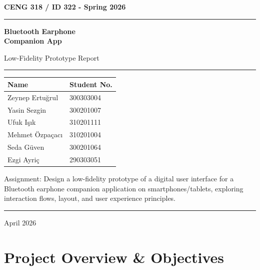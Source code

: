 \documentclass[12pt, a4paper]{report}
\newenvironment{highlight}{%
  \par\vspace{6pt}%
  \noindent%
  \begin{lrbox}{\hlbox}%
    \begin{minipage}{\dimexpr\linewidth-14pt\relax}%
      \vspace{6pt}\small%
}{%
      \vspace{6pt}%
    \end{minipage}%
  \end{lrbox}%
  \noindent\colorbox{lightgray}{%
    \hspace{2pt}%
    \textcolor{accentblue}{\rule[-0.2\baselineskip]{2pt}{\dimexpr\ht\hlbox+\dp\hlbox\relax}}%
    \hspace{8pt}\usebox{\hlbox}\hspace{2pt}%
  }%
  \par\vspace{6pt}%
}
\begin{document}

\begin{titlepage}
  \centering
  \vspace*{2cm}
  {\large\bfseries CENG 318 / ID 322 - Spring 2026}\par
  \vspace{1cm}
  \rule{\linewidth}{1.5pt}\par\vspace{0.5cm}
  {\Huge\bfseries Bluetooth Earphone\\[0.3cm]Companion App}\par
  \vspace{0.4cm}
  {\LARGE Low-Fidelity Prototype Report}\par
  \vspace{0.5cm}
  \rule{\linewidth}{1.5pt}\par
  \vspace{1.5cm}

  {\large
    \begin{tabular}{ll}
      \toprule
      Name & Student No. \\
      \midrule
      Zeynep Ertuğrul & 300303004 \\
      Yasin Sezgin & 300201007 \\
      Ufuk Işık & 310201111 \\
      Mehmet Özpaçacı & 310201004 \\
      Seda Güven & 300201064 \\
      Ezgi Ayriç & 290303051 \\
      \bottomrule
    \end{tabular}
  }\par
  \vspace{1.5cm}

  \begin{highlight}
    Assignment: Design a low-fidelity prototype of a digital user interface
    for a Bluetooth earphone companion application on smartphones/tablets, exploring
    interaction flows, layout, and user experience principles.
  \end{highlight}

  \vfill
  {\large April 2026}
\end{titlepage}

\tableofcontents
\clearpage

\chapter{Project Overview \& Objectives}
\end{document}

